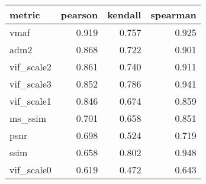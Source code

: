 \begin{tabular}{lrrr}
\toprule
     metric &  pearson &  kendall &  spearman \\
\midrule
       vmaf &    0.919 &    0.757 &     0.925 \\
       adm2 &    0.868 &    0.722 &     0.901 \\
 vif\_scale2 &    0.861 &    0.740 &     0.911 \\
 vif\_scale3 &    0.852 &    0.786 &     0.941 \\
 vif\_scale1 &    0.846 &    0.674 &     0.859 \\
    ms\_ssim &    0.701 &    0.658 &     0.851 \\
       psnr &    0.698 &    0.524 &     0.719 \\
       ssim &    0.658 &    0.802 &     0.948 \\
 vif\_scale0 &    0.619 &    0.472 &     0.643 \\
\bottomrule
\end{tabular}
